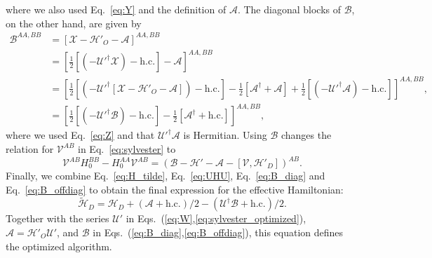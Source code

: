 %
where we also used Eq.~\eqref{eq:Y} and the definition of $\mathcal{A}$.
The diagonal blocks of $\mathcal{B}$, on the other hand, are given by
%
\begin{equation}
\label{eq:B_diag}
\begin{aligned}
  \mathcal{B}^{AA, BB} &= \left[\mathcal{X} - \mathcal{H}'_{O} - \mathcal{A}\right]^{AA, BB} \\
  &= \left[\frac{1}{2}[(-\mathcal{U}'^\dagger \mathcal{X})- \textrm{h.c.}] - \mathcal{A}\right]^{AA, BB} \\
  &= \left[\frac{1}{2}[(-\mathcal{U}'^\dagger [\mathcal{X} - \mathcal{H}'_{O} - \mathcal{A}])- \textrm{h.c.}] - \frac{1}{2}[\mathcal{A}^\dagger + \mathcal{A} ] + {\frac{1}{2}[( - \mathcal{U}'^\dagger\mathcal{A} ) - \textrm{h.c.}]}\right]^{AA, BB}, \\
  &= \left[\frac{1}{2}[(-\mathcal{U}'^\dagger \mathcal{B})- \textrm{h.c.}] - \frac{1}{2}[\mathcal{A}^\dagger + \textrm{h.c.} ]\right]^{AA, BB},
\end{aligned}
\end{equation}
%
where we used Eq.~\eqref{eq:Z} and that $\mathcal{U}'^\dagger \mathcal{A}$ is Hermitian.
%
Using $\mathcal{B}$ changes the relation for $\mathcal{V}^{AB}$ in Eq.~\eqref{eq:sylvester} to
\begin{equation}
\label{eq:sylvester_optimized}
\mathcal{V}^{AB}H_0^{BB} - H_0^{AA}\mathcal{V}^{AB} = \left(\mathcal{B} - \mathcal{H}' - \mathcal{A} - [\mathcal{V}, \mathcal{H}'_{D}]\right)^{AB}.
\end{equation}
Finally, we combine Eq.~\eqref{eq:H_tilde}, Eq.~\eqref{eq:UHU}, Eq.~\eqref{eq:B_diag} and Eq.~\eqref{eq:B_offdiag} to obtain the final expression for the effective Hamiltonian:
%
\begin{equation}
\label{eq:H_tilde_optimized}
\tilde{\mathcal{H}}_D = \mathcal{H}_D + (\mathcal{A} + \textrm{h.c.})/2 -(\mathcal{U}^\dagger \mathcal{B} + \textrm{h.c.})/2.
\end{equation}
Together with the series $\mathcal{U}'$ in Eqs.~(\ref{eq:W},\ref{eq:sylvester_optimized}), $\mathcal{A} = \mathcal{H}'_{O}\mathcal{U}'$, and $\mathcal{B}$ in Eqs.~(\ref{eq:B_diag},\ref{eq:B_offdiag}), this equation defines the optimized algorithm.
